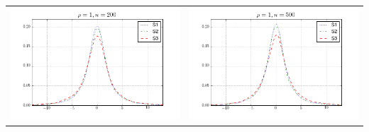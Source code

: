 \begin{table}[!ht]
{\begin{tabular}{c c}
\includegraphics[width=8cm]{beta2_scaled_density_200_1} & \includegraphics[width=8cm]{beta2_scaled_density_500_1} \\
\end{tabular}
}
\end{table}


